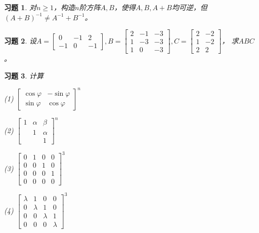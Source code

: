 \documentclass[a4paper]{book}
\newtheorem{ex}{习题}[chapter]
\newcommand{\enum}{\begin{list}{}{\setlength{\leftmargin}{0pt} \setlength{\itemindent}{2.5em} \setlength{\listparindent}{2em}}}
\begin{document}
\begin{ex} \label{ex:3.10}
对$n\geqslant 1$，构造$n$阶方阵$A, B$，使得$A, B, A+B$均可逆，但$(A+B)^{-1}\neq A^{-1}+B^{-1}$。
\end{ex}

\begin{ex} \label{ex:3.11}
设$A = \begin{bmatrix} 0 & -1 & 2 \\ -1 & 0 & -1 \end{bmatrix}, B = \begin{bmatrix} 2 & -1 & -3 \\ 1 & -3 & -3 \\ 1 & 0 & -3 \end{bmatrix}, C = \begin{bmatrix} 2 & -2 \\ 1 & -2 \\ 2 & 2 \end{bmatrix}$， 求$ABC$。
\end{ex}

\begin{ex} \label{ex:3.12}
计算

\enum
\item[(1)] $\begin{bmatrix} \cos\varphi & -\sin\varphi \\ \sin\varphi & \cos\varphi \end{bmatrix}^n$

\item[(2)] $\begin{bmatrix} 1 & \alpha & \beta \\ & 1 & \alpha \\ & & 1 \end{bmatrix}^{n}$

\item[(3)] $\begin{bmatrix} 0 & 1 & 0 & 0 \\ 0 & 0 & 1 & 0 \\ 0 & 0 & 0 & 1 \\ 0 & 0 & 0 & 0\end{bmatrix}^3$

\item[(4)] $\begin{bmatrix} \lambda & 1 & 0 & 0 \\ 0 & \lambda & 1 & 0 \\ 0 & 0 & \lambda & 1 \\ 0 & 0 & 0 & \lambda\end{bmatrix}^3$
\end{list}
\end{ex}
\end{document}
